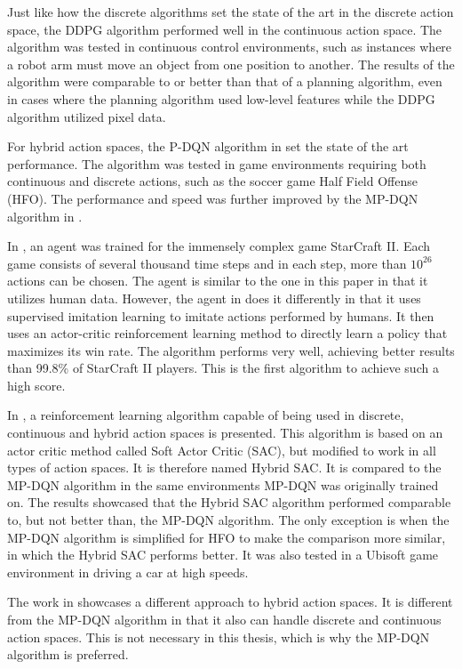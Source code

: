 \documentclass{kththesis}
\begin{document}
Just like how the discrete algorithms set the state of the art in the discrete action space, the DDPG algorithm performed well in the continuous action space. The algorithm was tested in continuous control environments, such as instances where a robot arm must move an object from one position to another. The results of the algorithm were comparable to or better than that of a planning algorithm, even in cases where the planning algorithm used low-level features while the DDPG algorithm utilized pixel data. \parencite{lillicrap2015continuous}

For hybrid action spaces, the P-DQN algorithm in \textcite{xiong2018parametrized} set the state of the art performance. The algorithm was tested in game environments requiring both continuous and discrete actions, such as the soccer game Half Field Offense (HFO). The performance and speed was further improved by the MP-DQN algorithm in \textcite{bester2019mpdqn}.

In \textcite{vinyals2019grandmaster}, an agent was trained for the immensely complex game StarCraft II. Each game consists of several thousand time steps and in each step, more than $10^{26}$ actions can be chosen. The agent is similar to the one in this paper in that it utilizes human data. However, the agent in \textcite{vinyals2019grandmaster} does it differently in that it uses supervised imitation learning to imitate actions performed by humans. It then uses an actor-critic reinforcement learning method to directly learn a policy that maximizes its win rate. The algorithm performs very well, achieving better results than 99.8\% of StarCraft II players. This is the first algorithm to achieve such a high score.

In \textcite{delalleau2019discrete}, a reinforcement learning algorithm capable of being used in discrete, continuous and hybrid action spaces is presented. This algorithm is based on an actor critic method called Soft Actor Critic (SAC), but modified to work in all types of action spaces. It is therefore named Hybrid SAC. It is compared to the MP-DQN algorithm in the same environments MP-DQN was originally trained on. The results showcased that the Hybrid SAC algorithm performed comparable to, but not better than, the MP-DQN algorithm. The only exception is when the MP-DQN algorithm is simplified for HFO to make the comparison more similar, in which the Hybrid SAC performs better. It was also tested in a Ubisoft game environment in driving a car at high speeds.

The work in \textcite{delalleau2019discrete} showcases a different approach to hybrid action spaces. It is different from the MP-DQN algorithm in that it also can handle discrete and continuous action spaces. This is not necessary in this thesis, which is why the MP-DQN algorithm is preferred.
\end{document}
